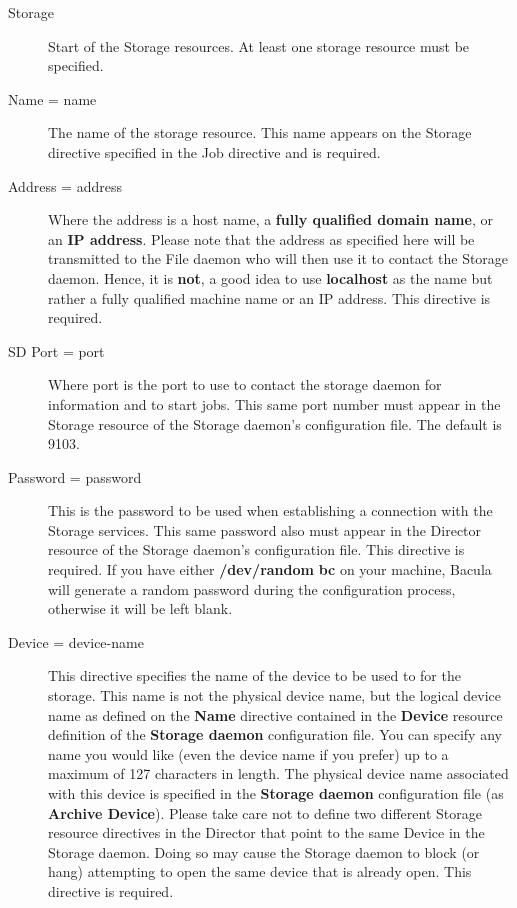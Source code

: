 \begin{description}

\item [Storage]
   Start of the Storage resources. At least one  storage resource must be
specified. 

\item [Name = \lt{}name\gt{}]
   The name of the storage resource. This  name appears on the Storage directive
specified in the Job directive and  is required. 

\item [Address = \lt{}address\gt{}]
   Where the address is a host name,  a {\bf fully qualified domain name}, or an
{\bf IP address}. Please note  that the \lt{}address\gt{} as specified here
will be transmitted to  the File daemon who will then use it to contact the
Storage daemon. Hence,  it is {\bf not}, a good idea to use {\bf localhost} as
the  name but rather a fully qualified machine name or an IP address.  This
directive is required. 

\item [SD Port = \lt{}port\gt{}]
   Where port is the port to use to  contact the storage daemon for information
and to start jobs.  This same port number must appear in the Storage resource
of the  Storage daemon's configuration file. The default is 9103. 

\item [Password = \lt{}password\gt{}]
   This is the password to be used  when establishing a connection with the
Storage services. This  same password also must appear in the Director
resource of the Storage  daemon's configuration file. This directive is
required.  If you have either {\bf /dev/random}  {\bf bc} on your machine,
Bacula will generate a random  password during the configuration process,
otherwise it will  be left blank. 

\item [Device = \lt{}device-name\gt{}]
   This directive specifies the name  of the device to be used to for the
storage. This name is not the  physical device name, but the logical device
name as defined on the  {\bf Name} directive contained in the {\bf Device}
resource  definition of the {\bf Storage daemon} configuration file.  You can
specify any name you would like (even the device name if  you prefer) up to a
maximum of 127 characters in length.  The physical device name associated with
this device is specified in  the {\bf Storage daemon} configuration file (as
{\bf Archive  Device}). Please take care not to define two different  Storage
resource directives in the Director that point to the  same Device in the
Storage daemon. Doing so may cause the  Storage daemon to block (or hang)
attempting to open the  same device that is already open. This directive is
required. 


\end{description}
